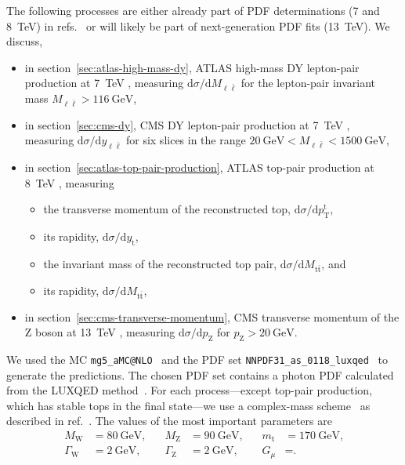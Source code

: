 The following processes are either already part of PDF determinations (7 and \SI{8}{\tera\electronvolt}) in refs.~\cite{} or will likely be part of next-generation PDF fits (\SI{13}{\tera\electronvolt}).
We discuss,
\begin{itemize}
\item in section~\ref{sec:atlas-high-mass-dy}, ATLAS high-mass DY lepton-pair production at \SI{7}{\tera\electronvolt} \cite{Aad:2013iua}, measuring $\mathrm{d} \sigma / \mathrm{d} M_{\ell \bar{\ell}}$ for the lepton-pair invariant mass $M_{\ell \bar{\ell}} > \SI{116}{\giga\electronvolt}$,
\item in section~\ref{sec:cms-dy}, CMS DY lepton-pair production at \SI{7}{\tera\electronvolt} \cite{Chatrchyan:2013tia}, measuring $\mathrm{d} \sigma / \mathrm{d} y_{\ell \bar{\ell}}$ for six slices in the range $\SI{20}{\giga\electronvolt} < M_{\ell \bar{\ell}} < \SI{1500}{\giga\electronvolt}$,
\item in section~\ref{sec:atlas-top-pair-production}, ATLAS top-pair production at \SI{8}{\tera\electronvolt} \cite{Aad:2015mbv}, measuring
\begin{itemize}
\item the transverse momentum of the reconstructed top, $\mathrm{d} \sigma / \mathrm{d} p_\mathrm{T}^\mathrm{t}$,
\item its rapidity, $\mathrm{d} \sigma / \mathrm{d} y_\mathrm{t}$,
\item the invariant mass of the reconstructed top pair, $\mathrm{d} \sigma / \mathrm{d} M_{\mathrm{t} \bar{\mathrm{t}}}$, and
\item its rapidity, $\mathrm{d} \sigma / \mathrm{d} M_{\mathrm{t} \bar{\mathrm{t}}}$,
\end{itemize}
\item in section~\ref{sec:cms-transverse-momentum}, CMS transverse momentum of the Z boson at \SI{13}{\tera\electronvolt} \cite{Sirunyan:2019bzr}, measuring $\mathrm{d} \sigma / \mathrm{d} p_\mathrm{Z}$ for $p_\mathrm{Z} > \SI{20}{\giga\electronvolt}$.
\end{itemize}
We used the MC \texttt{mg5\_aMC@NLO}~\cite{} and the PDF set \texttt{NNPDF31\_as\_0118\_luxqed}~\cite{} to generate the predictions.
The chosen PDF set contains a photon PDF calculated from the LUXQED method~\cite{}.
For each process---except top-pair production, which has stable tops in the final state---we use a complex-mass scheme~\cite{} as described in ref.~\cite{}.
The values of the most important parameters are
\begin{equation}
\begin{aligned}
M_\mathrm{W} &= \SI{80}{\giga\electronvolt} \text{,} \quad &
M_\mathrm{Z} &= \SI{90}{\giga\electronvolt} \text{,} \quad &
m_\mathrm{t} &= \SI{170}{\giga\electronvolt} \text{,} \\
\Gamma_\mathrm{W} &= \SI{2}{\giga\electronvolt} \text{,} &
\Gamma_\mathrm{Z} &= \SI{2}{\giga\electronvolt} \text{,} &
G_\mu &= \text{.}
\end{aligned}
\end{equation}

